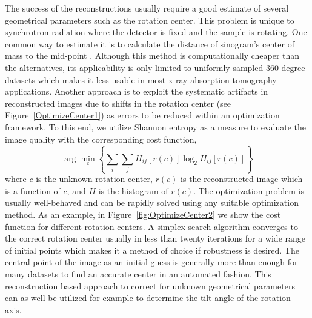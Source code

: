 \documentclass[pdf]{iucr}              %
\begin{document}
The success of the reconstructions usually require a good estimate of several geometrical parameters such as the rotation center. This problem is unique to synchrotron radiation where the detector is fixed and the sample is rotating. One common way to estimate it is to calculate the distance of sinogram's center of mass to the mid-point \cite{Azevedo}. Although this method is computationally cheaper than the alternatives, its applicability is only limited to uniformly sampled 360 degree datasets which makes it less usable in most x-ray absorption tomography applications. Another approach is to exploit the systematic artifacts in reconstructed images due to shifts in the rotation center \cite{donath_spie_2006} (see Figure~\ref{OptimizeCenter1}) as errors to be reduced within an optimization framework. To this end, we utilize Shannon entropy as a measure to evaluate the image quality with the corresponding cost function,
\begin{equation}
\arg \min_c \left\{\sum_i \sum_jH_{ij}\left[r(c)\right]\log_2 H_{ij}\left[r(c)\right]\right\}
\end{equation}
where $c$ is the unknown rotation center, $r(c)$ is the reconstructed image which is a function of $c$, and $H$ is the histogram of $r(c)$. The optimization problem is usually well-behaved and can be rapidly solved using any suitable optimization method.  As an example, in Figure~\ref{fig:OptimizeCenter2} we show the cost function for different rotation centers. A simplex search algorithm converges to the correct rotation center usually in less than twenty iterations for a wide range of initial points which makes it a method of choice if robustness is desired. The central point of the image as an initial guess is generally more than enough for many datasets to find an accurate center in an automated fashion. This reconstruction based approach to correct for unknown geometrical parameters can as well be utilized for example to determine the tilt angle of the rotation axis.
\end{document}
